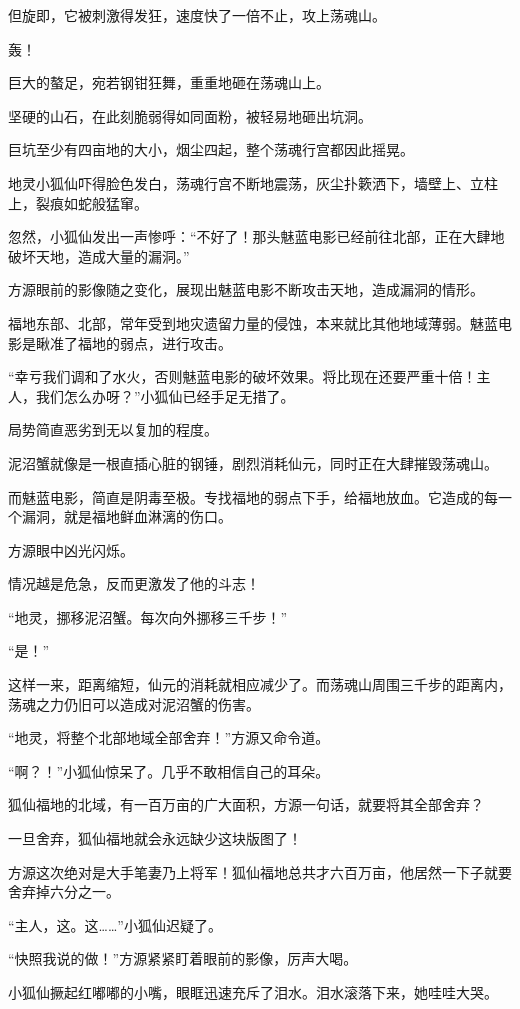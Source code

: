 \begin{this_body}
但旋即，它被刺激得发狂，速度快了一倍不止，攻上荡魂山。

轰！

巨大的螯足，宛若钢钳狂舞，重重地砸在荡魂山上。

坚硬的山石，在此刻脆弱得如同面粉，被轻易地砸出坑洞。

巨坑至少有四亩地的大小，烟尘四起，整个荡魂行宫都因此摇晃。

地灵小狐仙吓得脸色发白，荡魂行宫不断地震荡，灰尘扑簌洒下，墙壁上、立柱上，裂痕如蛇般猛窜。

忽然，小狐仙发出一声惨呼：“不好了！那头魅蓝电影已经前往北部，正在大肆地破坏天地，造成大量的漏洞。”

方源眼前的影像随之变化，展现出魅蓝电影不断攻击天地，造成漏洞的情形。

福地东部、北部，常年受到地灾遗留力量的侵蚀，本来就比其他地域薄弱。魅蓝电影是瞅准了福地的弱点，进行攻击。

“幸亏我们调和了水火，否则魅蓝电影的破坏效果。将比现在还要严重十倍！主人，我们怎么办呀？”小狐仙已经手足无措了。

局势简直恶劣到无以复加的程度。

泥沼蟹就像是一根直插心脏的钢锤，剧烈消耗仙元，同时正在大肆摧毁荡魂山。

而魅蓝电影，简直是阴毒至极。专找福地的弱点下手，给福地放血。它造成的每一个漏洞，就是福地鲜血淋漓的伤口。

方源眼中凶光闪烁。

情况越是危急，反而更激发了他的斗志！

“地灵，挪移泥沼蟹。每次向外挪移三千步！”

“是！”

这样一来，距离缩短，仙元的消耗就相应减少了。而荡魂山周围三千步的距离内，荡魂之力仍旧可以造成对泥沼蟹的伤害。

“地灵，将整个北部地域全部舍弃！”方源又命令道。

“啊？！”小狐仙惊呆了。几乎不敢相信自己的耳朵。

狐仙福地的北域，有一百万亩的广大面积，方源一句话，就要将其全部舍弃？

一旦舍弃，狐仙福地就会永远缺少这块版图了！

方源这次绝对是大手笔妻乃上将军！狐仙福地总共才六百万亩，他居然一下子就要舍弃掉六分之一。

“主人，这。这……”小狐仙迟疑了。

“快照我说的做！”方源紧紧盯着眼前的影像，厉声大喝。

小狐仙撅起红嘟嘟的小嘴，眼眶迅速充斥了泪水。泪水滚落下来，她哇哇大哭。


\end{this_body}
